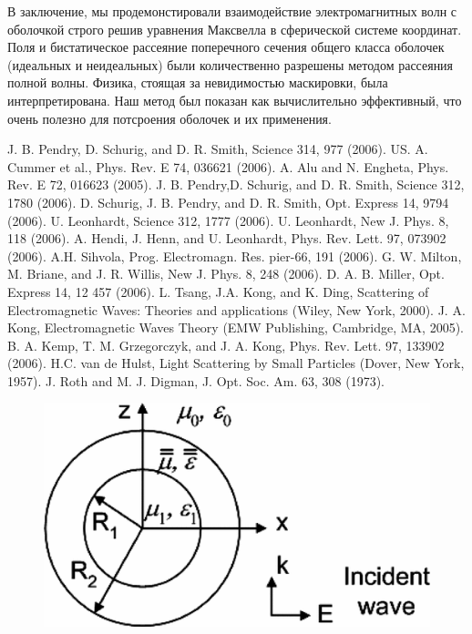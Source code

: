 \documentclass[a4paper, 12pt]{article}
\begin{document}
В заключение, мы продемонстировали взаимодействие электромагнитных волн с 
оболочкой строго решив уравнения Максвелла в сферической системе координат.
Поля и бистатическое рассеяние поперечного сечения общего класса оболочек
(идеальных и неидеальных) были количественно разрешены методом рассеяния
полной волны. Физика, стоящая за невидимостью маскировки, была интерпретирована.
Наш метод был показан как вычислительно эффективный, что очень полезно для
потсроения оболочек и их применения.


\begin{thebibliography}{99}
J. B. Pendry, D. Schurig, and D. R. Smith, Science 314, 977 (2006).
US. A. Cummer et al., Phys. Rev. E 74, 036621 (2006).
A. Alu and N. Engheta, Phys. Rev. E 72, 016623 (2005).
J. B. Pendry,D. Schurig, and D. R. Smith, Science 312, 1780 (2006).
D. Schurig, J. B. Pendry, and D. R. Smith, Opt. Express 14,
9794 (2006).
U. Leonhardt, Science 312, 1777 (2006).
U. Leonhardt, New J. Phys. 8, 118 (2006).
A. Hendi, J. Henn, and U. Leonhardt, Phys. Rev. Lett. 97,
073902 (2006).
A.H. Sihvola, Prog. Electromagn. Res. pier-66, 191
(2006).
G. W. Milton, M. Briane, and J. R. Willis, New J. Phys. 8,
248 (2006).
D. A. B. Miller, Opt. Express 14, 12 457 (2006).
L. Tsang, J.A. Kong, and K. Ding, Scattering of
Electromagnetic Waves: Theories and applications
(Wiley, New York, 2000).
J. A. Kong, Electromagnetic Waves Theory (EMW Publishing, Cambridge, 
MA, 2005).
B. A. Kemp, T. M. Grzegorczyk, and J. A.
Kong, Phys. Rev. Lett. 97, 133902 (2006).
H.C. van de Hulst, Light Scattering by Small Particles (Dover, New 
York, 1957).
J. Roth and M. J. Digman, J. Opt. Soc. Am. 63, 308 (1973).

\end{thebibliography}

\begin{figure}[h]
  \centering
  \includegraphics[height=0.25\paperheight]{fig1.png}
  \caption{}
  \label{fig:1}
\end{figure}
\end{document}
